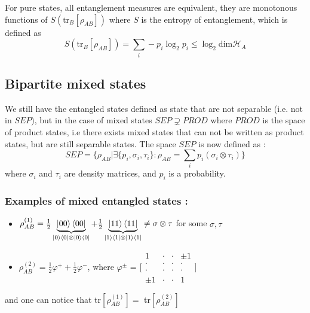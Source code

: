 \documentclass{article}
\begin{document}
For pure states, all entanglement measures are equivalent, they are monotonous
functions of $S(\text{tr}_B[\rho_{AB}])$ where $S$ is the entropy of
entanglement, which is defined as
\begin{equation}
    \label{entenglement-entropy}
    S(\text{tr}_B[\rho_{AB}]) =\sum_i -p_i \log_2 p_i \leq \log_2 \text{dim}\mathscr{H}_A
\end{equation}

\subsection{Bipartite mixed states}
We still have the entangled states defined as state that are not separable
(i.e. not in $SEP$), but in the case of mixed states $SEP \supsetneq PROD$ where
$PROD$ is the space of product states, i.e there exists mixed states that can not be
written as product states, but are still separable states.
The space $SEP$ is now defined as :
\begin{equation}
    \label{def-mixed-state-sep}
    SEP = \big\{\rho_{AB} | \exists \{p_i, \sigma_i, \tau_i\} : \rho_{AB} = \sum_i p_i (\sigma_i \otimes \tau_i) \big\}
\end{equation}
where $\sigma_i$ and $\tau_i$ are density matrices, and $p_i$ is a probability.
\subsubsection*{Examples of mixed entangled states :}
\begin{itemize}[label=-]
    \item $\rho_{AB}^{(1)} =
    \frac{1}{2}\underbrace{\ket{00}\bra{00}}_{\ket{0}\bra{0}\otimes\ket{0}\bra{0}}
    +\frac{1}{2}\underbrace{\ket{11}\bra{11}}_{\ket{1}\bra{1}\otimes\ket{1}\bra{1}}
    \neq\sigma \otimes \tau $ for some $\sigma, \tau$
    \item $\rho_{AB}^{(2)} = \frac{1}{2} \varphi^+ + \frac{1}{2} \varphi^-$, where
    $\varphi^\pm$ = $\Biggl[\begin{smallmatrix} 1 & \cdot & \cdot & \pm 1 \\
       \cdot & \cdot & \cdot & \cdot \\
       \cdot & \cdot & \cdot & \cdot \\
       \pm 1 & \cdot & \cdot & 1 \end{smallmatrix} \Biggr]$
\end{itemize}
and one can notice that tr$[\rho_{AB}^{(1)}] = $ tr$[\rho_{AB}^{(2)}]$
\end{document}
